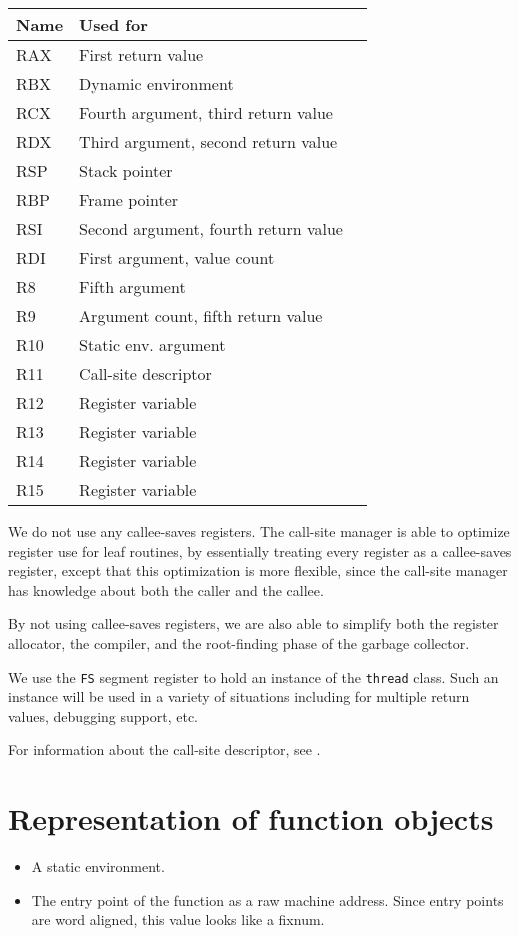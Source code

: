 \begin{tabular}{|l|l|l|}
\hline
Name & Used for\\
\hline
\hline
RAX & First return value\\
RBX & Dynamic environment\\
RCX & Fourth argument, third return value \\
RDX & Third argument, second return value\\
RSP & Stack pointer \\
RBP & Frame pointer \\
RSI & Second argument, fourth return value\\
RDI & First argument, value count\\
R8  & Fifth argument\\
R9  &  Argument count, fifth return value\\
R10 & Static env. argument\\
R11 & Call-site descriptor\\
R12 & Register variable\\
R13 & Register variable\\
R14 & Register variable\\
R15 & Register variable\\
\hline
\end{tabular}

We do not use any callee-saves registers.  The call-site manager is
able to optimize register use for leaf routines, by essentially
treating every register as a callee-saves register, except that this
optimization is more flexible, since the call-site manager has
knowledge about both the caller and the callee.

By not using callee-saves registers, we are also able to simplify both
the register allocator, the compiler, and the root-finding phase of
the garbage collector.

We use the \texttt{FS} segment register to hold an instance of the
\texttt{thread} class.  Such an instance will be used in a variety of
situations including for multiple return values, debugging support,
etc.

For information about the call-site descriptor, see
.

\section{Representation of function objects}

\begin{itemize}
\item A static environment.
\item The entry point of the function as a raw machine address.  Since
  entry points are word aligned, this value looks like a fixnum.
\end{itemize}

